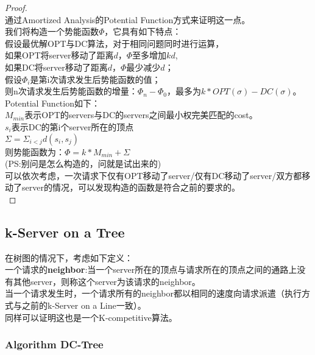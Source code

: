 \documentclass[11pt]{ctexart}
\newtheorem{proof}{Proof}[section]
\begin{document}
\begin{proof}\\
通过Amortized Analysis的Potential Function方式来证明这一点。\\
我们将构造一个势能函数$\Phi$，它具有如下特点：\\

假设最优解OPT与DC算法，对于相同问题同时进行运算，\\
如果OPT将server移动了距离$d$，$\Phi$至多增加$kd$,\\
如果DC将server移动了距离$d$，$\Phi$最少减少$d$；\\
假设$\Phi_i$是第i次请求发生后势能函数的值；\\
则n次请求发生后势能函数的增量：$\Phi_n-\Phi_0$，最多为$k*OPT(\sigma)-DC(\sigma)$。\\

Potential Function如下：\\
$M_{min}$表示OPT的servers与DC的servers之间最小权完美匹配的cost。\\
$s_i$表示DC的第i个server所在的顶点\\
$\Sigma=\Sigma_{i<j}d(s_i,s_j)$\\
则势能函数为：$\Phi=k*M_{min}+\Sigma$\\

(PS:别问是怎么构造的，问就是试出来的)\\

可以依次考虑，一次请求下仅有OPT移动了server/仅有DC移动了server/双方都移动了server的情况，可以发现构造的函数是符合之前的要求的。\\
\end{proof}

\subsection{k-Server on a Tree}
在树图的情况下，考虑如下定义：\\

一个请求的\textbf{neighbor}:当一个server所在的顶点与请求所在的顶点之间的通路上没有其他server，则称这个server为该请求的neighbor。\\

当一个请求发生时，一个请求所有的neighbor都以相同的速度向请求派遣（执行方式与之前的k-Server on a Line一致）。\\

同样可以证明这也是一个K-competitive算法。

\subsubsection{Algorithm DC-Tree}
\end{document}
